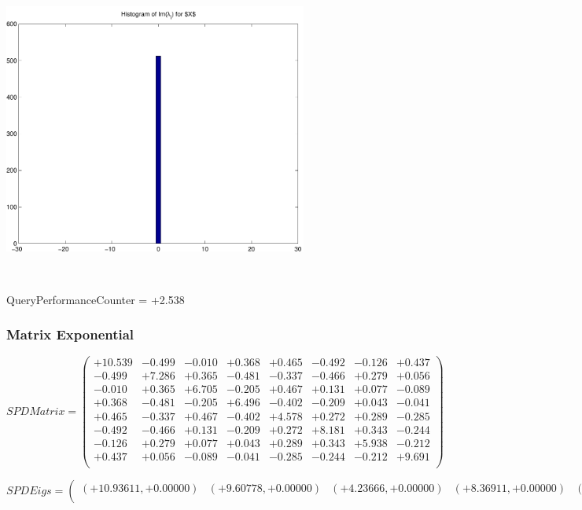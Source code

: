 \documentclass[9pt]{article}
\theoremstyle{plain}
\theoremstyle{definition}
\theoremstyle{remark}
\numberwithin{equation}{section}
\begin{document}
\includegraphics[width=10.0cm,height=10.0cm]{Im_lambda_n.pdf}

QueryPerformanceCounter  =  +2.538
\subsubsection{Matrix Exponential }
$SPD Matrix = \left(
\begin{array}{
cccccccc}
+10.539 & -0.499 & -0.010 & +0.368 & +0.465 & -0.492 & -0.126 & +0.437 \\
-0.499 & +7.286 & +0.365 & -0.481 & -0.337 & -0.466 & +0.279 & +0.056 \\
-0.010 & +0.365 & +6.705 & -0.205 & +0.467 & +0.131 & +0.077 & -0.089 \\
+0.368 & -0.481 & -0.205 & +6.496 & -0.402 & -0.209 & +0.043 & -0.041 \\
+0.465 & -0.337 & +0.467 & -0.402 & +4.578 & +0.272 & +0.289 & -0.285 \\
-0.492 & -0.466 & +0.131 & -0.209 & +0.272 & +8.181 & +0.343 & -0.244 \\
-0.126 & +0.279 & +0.077 & +0.043 & +0.289 & +0.343 & +5.938 & -0.212 \\
+0.437 & +0.056 & -0.089 & -0.041 & -0.285 & -0.244 & -0.212 & +9.691 \\
\end{array}
\right)$ \newline 

$SPD Eigs = \left(
\begin{array}{
cccccccc}
(+10.93611,+0.00000) & (+9.60778,+0.00000) & (+4.23666,+0.00000) & (+8.36911,+0.00000) & (+7.56229,+0.00000) & (+5.82791,+0.00000) & (+6.54198,+0.00000) & (+6.33139,+0.00000) \\
\end{array}
\right)$ \newline 
\end{document}
